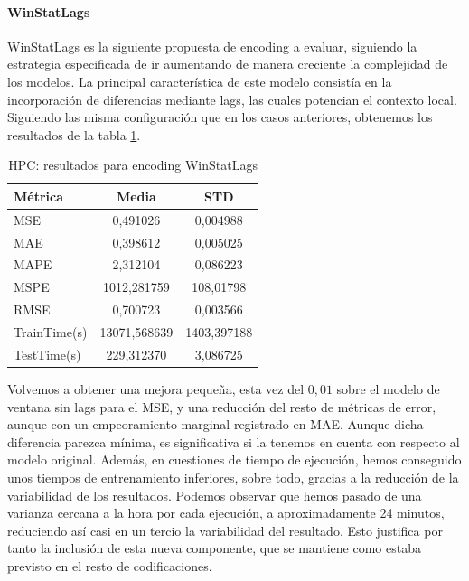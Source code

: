 \paragraph{WinStatLags}

WinStatLags es la siguiente propuesta de encoding a evaluar, siguiendo la estrategia especificada de ir aumentando de manera creciente la complejidad de los modelos. La principal característica de este modelo consistía en la incorporación de diferencias mediante lags, las cuales potencian el contexto local. Siguiendo las misma configuración que en los casos anteriores, obtenemos los resultados de la tabla \ref{hpcwinlags}.\\

\begin{table}[!ht]
	\centering
	\begin{tabular}{l|c|c}
		\toprule
		Métrica & Media & STD \\
		\midrule
		MSE & 0,491026 & 0,004988 \\
		MAE & 0,398612 & 0,005025 \\
		MAPE & 2,312104 & 0,086223 \\
		MSPE & 1012,281759 & 108,01798 \\
		RMSE & 0,700723 & 0,003566 \\
		TrainTime(s) & 13071,568639 & 1403,397188 \\
		TestTime(s) & 229,312370 & 3,086725 \\
		\bottomrule
	\end{tabular}
	\caption{HPC: resultados para encoding WinStatLags}
	\label{hpcwinlags}
\end{table}

Volvemos a obtener una mejora pequeña, esta vez del $0,01$ sobre el modelo de ventana sin lags para el MSE, y una reducción del resto de métricas de error, aunque con un empeoramiento marginal registrado en MAE. Aunque dicha diferencia parezca mínima, es significativa si la tenemos en cuenta con respecto al modelo original. Además, en cuestiones de tiempo de ejecución, hemos conseguido unos tiempos de entrenamiento inferiores, sobre todo, gracias a la reducción de la variabilidad de los resultados. Podemos observar que hemos pasado de una varianza cercana a la hora por cada ejecución, a aproximadamente 24 minutos, reduciendo así casi en un tercio la variabilidad del resultado. Esto justifica por tanto la inclusión de esta nueva componente, que se mantiene como estaba previsto en el resto de codificaciones.



